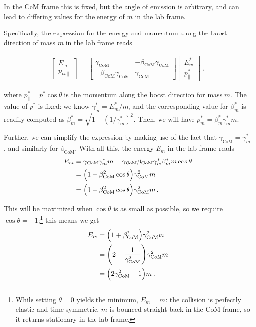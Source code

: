 \documentclass[main.tex]{subfiles}
\begin{document}
\begin{extracontent}
In the CoM frame this is fixed, but the angle of emission is arbitrary, and can lead to differing values for the energy of \(m\) in the lab frame.

Specifically, the expression for the energy and momentum along the boost direction of mass \(m\) in the lab frame reads 

\begin{align}
\left[\begin{array}{c}
E_m \\ 
p_{m \parallel}
\end{array}\right] = \left[\begin{array}{cc}
\gamma _{\text{CoM}} & - \beta _{\text{CoM}} \gamma _{\text{CoM}} \\ 
- \beta _{\text{CoM}} \gamma _{\text{CoM}} & \gamma _{\text{CoM}}
\end{array}\right]
\left[\begin{array}{c}
E^{*\prime}_m \\ 
p^{*}_\parallel
\end{array}\right]
\,,
\end{align}

where \(p_\parallel^{*} = p^{*} \cos \theta \) is the momentum along the boost direction for mass \(m\). 
The value of \(p^{*}\) is fixed: we know \(\gamma_m^* = E^{*}_m / m\), and the corresponding value for \(\beta _m^*\) is readily computed as \(\beta _m^* = \sqrt{ 1 - (1 / \gamma _m^*)^2}\). Then, we will have \(p^{*}_m = \beta_m^* \gamma _m^* m\). 

Further, we can simplify the expression by making use of the fact that \(\gamma _{\text{CoM}} = \gamma_{m}^{*}\), and similarly for \(\beta _{\text{CoM}}\). 
With all this, the energy \(E_m\) in the lab frame reads 
%
\begin{align}
E_m 
&= \gamma _{\text{CoM}} \gamma_m^* m - \gamma _{\text{CoM}} \beta _{\text{CoM}} \gamma_m^* \beta _m^* m \cos \theta  \\
&= \qty(1 - \beta _{\text{CoM}}^2 \cos \theta ) \gamma _{\text{CoM}}^2  m  \\
&= \qty(1 - \beta _{\text{CoM}}^2 \cos \theta )
\gamma^2 _{\text{CoM}}
m 
\,.
\end{align}

This will be maximized when \(\cos \theta \) is as small as possible, so we require \(\cos \theta = -1\);\footnote{While setting \(\theta = 0\) yields the minimum, \(E_m = m\): the collision is perfectly elastic and time-symmetric,  \(m\) is bounced straight back in the CoM frame, so it returns stationary in the lab frame.} this means we get 
%
\begin{align}
E_m &= \qty(1 + \beta^2 _{\text{CoM}}) 
\gamma^2 _{\text{CoM}}
m  \\
&= \qty(2 - \frac{1}{\gamma _{\text{CoM}}^2}) 
\gamma^2 _{\text{CoM}}
m  \\
&= \qty(2 \gamma^2 _{\text{CoM}} - 1) m  
\,.
\end{align}


\end{extracontent}
\end{document}
